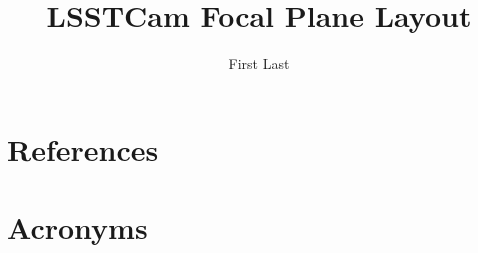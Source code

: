\documentclass[OPS,lsstdraft,authoryear,toc]{lsstdoc}
\title{LSSTCam Focal Plane Layout}
\author{%
First Last
}
\date{\vcsDate}
\begin{document}
\maketitle


\appendix
\section{References} \label{sec:bib}
\renewcommand{\refname}{} %


\section{Acronyms} \label{sec:acronyms}

\end{document}
